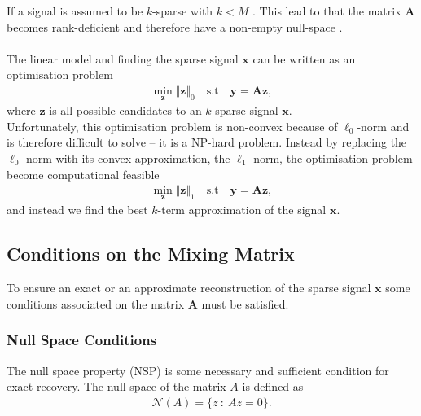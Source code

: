 If a signal is assumed to be $k$-sparse with $k<M$  
 \cite[p. 8]{CS}. This lead to that the matrix $\mathbf{A}$ becomes rank-deficient and therefore have a non-empty null-space \cite[p. i	x]{CS}.
\\ \\
The linear model and finding the sparse signal $\mathbf{x}$ can be written as an optimisation problem
\begin{align*}
\min_{\mathbf{z}} \Vert \mathbf{z} \Vert_0 \quad \text{s.t} \quad \mathbf{y} = \mathbf{Az},
\end{align*}
where $\mathbf{z}$ is all possible candidates to an $k$-sparse signal $\mathbf{x}$.
\\
Unfortunately, this optimisation problem is non-convex because of $\ell_0$-norm and is therefore difficult to solve -- it is a NP-hard problem. Instead by replacing the $\ell_0$-norm with its convex approximation, the $\ell_1$-norm, the optimisation problem become computational feasible \cite[p. 27]{CS}
\begin{align}\label{eq:p1}
\min_{\mathbf{z}} \Vert \mathbf{z} \Vert_1 \quad \text{s.t} \quad \mathbf{y} = \mathbf{Az},
\end{align} 
and instead we find the best $k$-term approximation of the signal $\mathbf{x}$.

\subsection{Conditions on the Mixing Matrix}
To ensure an exact or an approximate reconstruction of the sparse signal $\mathbf{x}$ some conditions associated on the matrix $\mathbf{A}$ must be satisfied.

\subsubsection{Null Space Conditions}
The null space property (NSP) is some necessary and sufficient condition for exact recovery.
The null space of the matrix $A$ is defined as
\begin{align*}
\mathcal{N}(A) = \{ z \ : \ Az = 0 \}.
\end{align*} 





